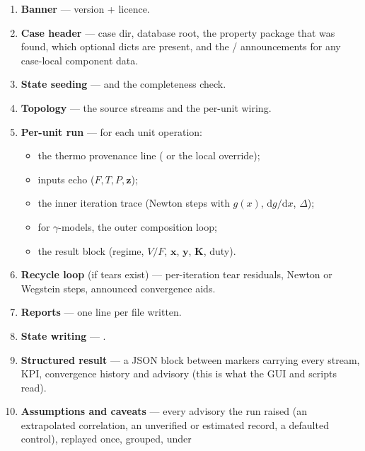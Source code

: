 \documentclass[11pt,a4paper]{article}
\begin{document}
\begin{enumerate}[leftmargin=*]
  \item \textbf{Banner} --- version + licence.
  \item \textbf{Case header} --- case dir, database root, the property
        package that was found, which optional dicts are present, and
        the \code{[overlay]}/\code{[estimate]} announcements for any
        case-local component data.
  \item \textbf{State seeding} ---
         and the completeness
        check.
  \item \textbf{Topology} --- the source streams and the per-unit
        wiring.
  \item \textbf{Per-unit run} --- for each unit operation:
    \begin{itemize}
      \item the thermo provenance line
            ( or the local
            override);
      \item inputs echo ($F, T, P, \mathbf{z}$);
      \item the inner iteration trace (Newton steps with $g(x)$,
            $\mathrm{d}g/\mathrm{d}x$, $\Delta$);
      \item for $\gamma$-models, the outer composition loop;
      \item the result block (regime, $V/F$, $\mathbf{x}$, $\mathbf{y}$,
            $\mathbf{K}$, duty).
    \end{itemize}
  \item \textbf{Recycle loop} (if tears exist) --- per-iteration tear
        residuals, Newton or Wegstein steps, announced convergence aids.
  \item \textbf{Reports} --- one \code{[report]} line per file written.
  \item \textbf{State writing} --- .
  \item \textbf{Structured result} --- a JSON block between
         markers carrying every stream,
        KPI, convergence history and advisory (this is what the GUI and
        scripts read).
  \item \textbf{Assumptions and caveats} --- every advisory the run
        raised (an extrapolated correlation, an unverified or estimated
        record, a defaulted control), replayed once, grouped, under

\end{enumerate}
\end{document}
